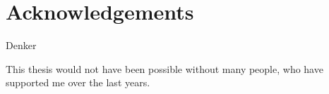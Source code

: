 \chapter{Acknowledgements}
\setcounter{page}{1}

{
	Denker
}

This thesis would not have been possible without many people, who have
supported me over the last years. 
%





